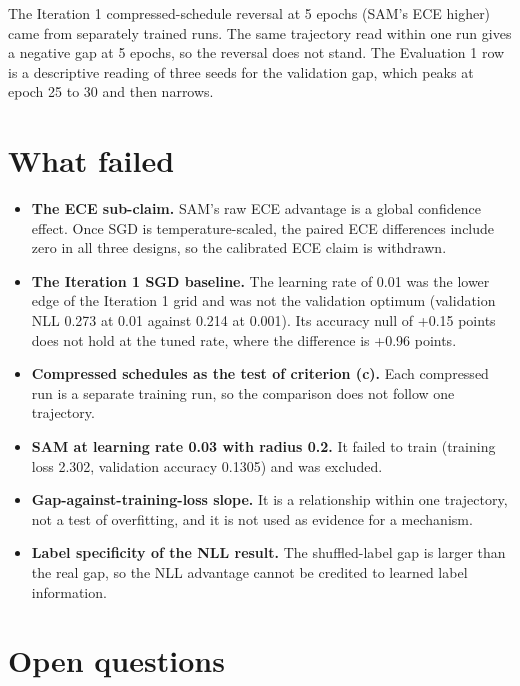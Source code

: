 \documentclass[10pt,letterpaper]{article}
\begin{document}
The Iteration 1 compressed-schedule reversal at 5 epochs (SAM's ECE higher) came from separately trained runs. The same trajectory read within one run gives a negative gap at 5 epochs, so the reversal does not stand. The Evaluation 1 row is a descriptive reading of three seeds for the validation gap, which peaks at epoch 25 to 30 and then narrows.

\section{What failed}

\begin{itemize}
\item \textbf{The ECE sub-claim.} SAM's raw ECE advantage is a global confidence effect. Once SGD is temperature-scaled, the paired ECE differences include zero in all three designs, so the calibrated ECE claim is withdrawn.
\item \textbf{The Iteration 1 SGD baseline.} The learning rate of 0.01 was the lower edge of the Iteration 1 grid and was not the validation optimum (validation NLL 0.273 at 0.01 against 0.214 at 0.001). Its accuracy null of +0.15 points does not hold at the tuned rate, where the difference is +0.96 points.
\item \textbf{Compressed schedules as the test of criterion (c).} Each compressed run is a separate training run, so the comparison does not follow one trajectory.
\item \textbf{SAM at learning rate 0.03 with radius 0.2.} It failed to train (training loss 2.302, validation accuracy 0.1305) and was excluded.
\item \textbf{Gap-against-training-loss slope.} It is a relationship within one trajectory, not a test of overfitting, and it is not used as evidence for a mechanism.
\item \textbf{Label specificity of the NLL result.} The shuffled-label gap is larger than the real gap, so the NLL advantage cannot be credited to learned label information.
\end{itemize}

\section{Open questions}
\end{document}
